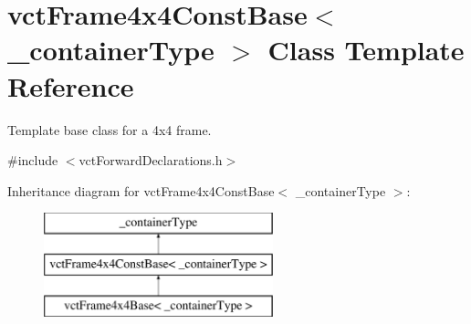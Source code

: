 \hypertarget{classvct_frame4x4_const_base}{\section{vct\-Frame4x4\-Const\-Base$<$ \-\_\-container\-Type $>$ Class Template Reference}
\label{classvct_frame4x4_const_base}
}


Template base class for a 4x4 frame.  




{\ttfamily \#include $<$vct\-Forward\-Declarations.\-h$>$}

Inheritance diagram for vct\-Frame4x4\-Const\-Base$<$ \-\_\-container\-Type $>$\-:\begin{figure}[H]
\begin{center}
\leavevmode
\includegraphics[height=3.000000cm]{d6/d73/classvct_frame4x4_const_base}
\end{center}
\end{figure}
